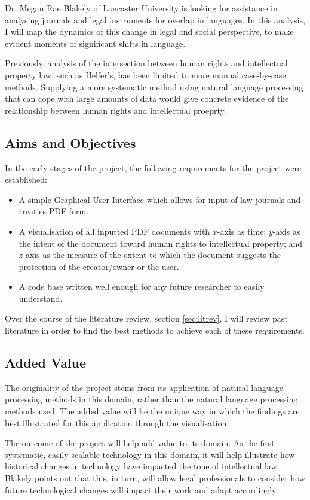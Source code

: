 			
			Dr. Megan Rae Blakely of Lancaster University is looking for assistance in analysing journals and legal instruments for overlap in languages. In this analysis, I will map the dynamics of this change in legal and social perspective, to make evident moments of significant shifts in language. 
			
			
			Previously, analysis of the intersection between human rights and intellectual property law, such as Helfer's\cite{hr_ip_conflict_coexistence_helfer}, has been limited to more manual case-by-case methods. Supplying a more systematic method using natural language processing that can cope with large amounts of data would give concrete evidence of the relationship between human rights and intellectual proeprty. 
			\newpage
		\subsection{Aims and Objectives}
			In the early stages of the project, the following requirements for the project were established:
			\begin{itemize}
				\item A simple Graphical User Interface which allows for input of law journals and treaties PDF form.
				\item A visualisation of all inputted PDF documents with $x$-axis as time; $y$-axis as the intent of the document toward human rights to intellectual property; and $z$-axis as the measure of the extent to which the document suggests the protection of the creator/owner or the user.
				\item A code base written well enough for any future researcher to easily understand.
			\end{itemize}
			Over the course of the literature review, section \ref{sec:litrev}, I will review past literature in order to find the best methods to achieve each of these requirements.
		\subsection{Added Value}
			The originality of the project stems from its application of natural language processing methods in this domain, rather than the natural language processing methods used. The added value will be the unique way in which the findings are best illustrated for this application through the visualisation.
			
			The outcome of the project will help add value to its domain. As the first systematic, easily scalable technology in this domain, it will help illustrate how historical changes in technology have impacted the tone of intellectual law. Blakely points out that this, in turn, will allow legal professionals to consider how future technological changes will impact their work and adapt accordingly.
			\newpage
